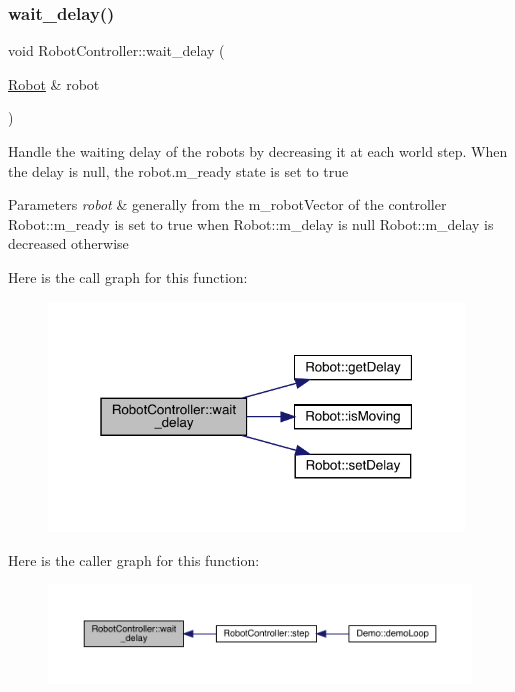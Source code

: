 \subsubsection{\texorpdfstring{wait\+\_\+delay()}{wait\_delay()}}
{\footnotesize\ttfamily void Robot\+Controller\+::wait\+\_\+delay (\begin{DoxyParamCaption}\item[{\mbox{\hyperlink{class_robot}{Robot}} \&}]{robot }\end{DoxyParamCaption})}

Handle the waiting delay of the robots by decreasing it at each world step. When the delay is null, the robot.\+m\+\_\+ready state is set to true 
\begin{DoxyParams}{Parameters}
{\em robot} & generally from the m\+\_\+robot\+Vector of the controller  Robot\+::m\+\_\+ready is set to true when Robot\+::m\+\_\+delay is null  Robot\+::m\+\_\+delay is decreased otherwise \\
\hline
\end{DoxyParams}
Here is the call graph for this function\+:\nopagebreak
\begin{figure}[H]
\begin{center}
\leavevmode
\includegraphics[width=313pt]{class_robot_controller_ae433d7a77a59e8eced35fc4885051805_cgraph}
\end{center}
\end{figure}
Here is the caller graph for this function\+:\nopagebreak
\begin{figure}[H]
\begin{center}
\leavevmode
\includegraphics[width=350pt]{class_robot_controller_ae433d7a77a59e8eced35fc4885051805_icgraph}
\end{center}
\end{figure}


